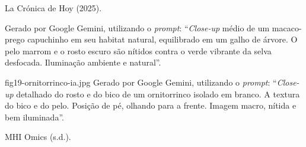 %
{La Crónica de Hoy (2025).}

%
{Gerado por Google Gemini, utilizando o \textit{prompt}: ``\textit{Close-up}
médio de um macaco-prego capuchinho em seu habitat natural, equilibrado em um
galho de árvore. O pelo marrom e o rosto escuro são nítidos contra o verde
vibrante da selva desfocada. Iluminação ambiente e natural''.}

%
{fig19-ornitorrinco-ia.jpg}%
{Gerado por Google Gemini, utilizando o \textit{prompt}: ``\textit{Close-up}
detalhado do rosto e do bico de um ornitorrinco isolado em branco. A textura do
bico e do pelo. Posição de pé, olhando para a frente. Imagem macro, nítida e bem
iluminada''.}

%
{MHI Omics (s.d.).}

